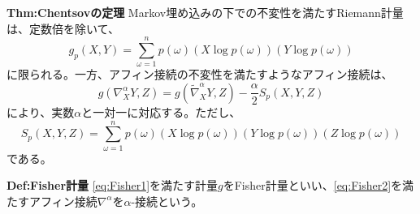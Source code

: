 \documentclass[a4paper,11pt]{jsarticle}
\numberwithin{equation}{section}
\begin{document}
\begin{itembox}[l]{\textbf{Thm:Chentsovの定理}}
    Markov埋め込みの下での不変性を満たすRiemann計量は、定数倍を除いて、
    \begin{equation}
        \label{eq:Fisher1}
        g_p(X,Y) = \sum_{\omega = 1}^{n} p(\omega) (X\log p(\omega))(Y\log p(\omega))
    \end{equation}
    に限られる。一方、アフィン接続の不変性を満たすようなアフィン接続は、
    \begin{equation}    
        \label{eq:Fisher2}
        g(\nabla_X^{\alpha} Y,Z) = g(\tilde{\nabla}_X^{\alpha} Y,Z) - \frac{\alpha}{2} S_p(X,Y,Z)
    \end{equation}
    により、実数$\alpha$と一対一に対応する。ただし、
    \begin{equation}
        S_p(X,Y,Z) = \sum_{\omega = 1}^{n} p(\omega) (X\log p(\omega))(Y\log p(\omega))(Z\log p(\omega))
    \end{equation}
    である。
\end{itembox}

\begin{itembox}[l]{\textbf{Def:Fisher計量}}
    \ref{eq:Fisher1}を満たす計量$g$をFisher計量といい、\ref{eq:Fisher2}を満たすアフィン接続$\nabla^{\alpha}$を$\alpha$-接続という。

\end{itembox}
\end{document}
